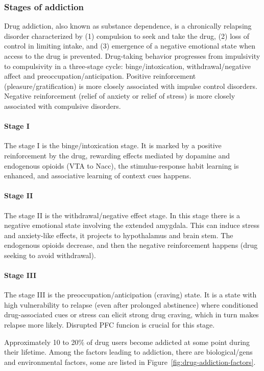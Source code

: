 \documentclass[12pt,article,oneside,a4paper]{memoir}
\begin{document}
\subsubsection{Stages of addiction}
Drug addiction, also known as substance dependence, is a chronically relapsing
disorder characterized by (1) compulsion to seek and take the drug, (2) loss of
control in limiting intake, and (3) emergence of a negative emotional state
when access to the drug is prevented.
Drug-taking behavior progresses from impulsivity to compulsivity in a
three-stage cycle: binge/intoxication, withdrawal/negative affect and
preoccupation/anticipation. Positive reinforcement (pleasure/gratification) is
more closely associated with impulse control disorders. Negative reinforcement
(relief of anxiety or relief of stress) is more closely associated with
compulsive disorders.

\paragraph{Stage I}
The stage I is the binge/intoxication stage. It is marked by a positive
reinforcement by the drug, rewarding effects mediated by dopamine and
endogenous opioids (VTA to Nacc), the stimulus-response habit learning is
enhanced, and associative learning of context cues happens.

\paragraph{Stage II}
The stage II is the withdrawal/negative effect stage. In this stage there is a
negative emotional state involving the extended amygdala. This can induce
stress and anxiety-like effects, it projects to hypothalamus and brain stem.
The endogenous opioids decrease, and then the negative reinforcement happens
(drug seeking to avoid withdrawal).

\paragraph{Stage III}
The stage III is the preoccupation/anticipation (craving) state. It is a state
with high vulnerability to relapse (even after prolonged abstinence) where
conditioned drug-associated cues or stress can elicit strong drug craving,
which in turn makes relapse more likely. Disrupted PFC funcion is crucial for
this stage.

Approximately 10 to 20\%  of drug users become addicted at some point during
their lifetime. Among the factors leading to addiction, there are
biological/gens and environmental factors, some are listed in
Figure~\ref{fig:drug-addiction-factors}.
\end{document}
